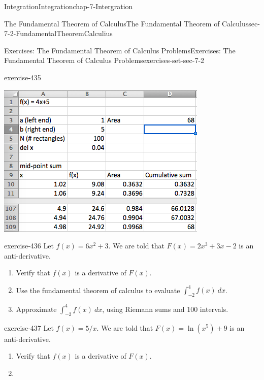 \documentclass[oneside,10pt,]{book}
\numberwithin{equation}{section}
\begin{document}
\begin{chapterptx}{Integration}{}{Integration}{}{}{chap-7-Intergration}
\begin{sectionptx}{The Fundamental Theorem of Calculus}{}{The Fundamental Theorem of Calculus}{}{}{sec-7-2-FundamentalTheoremCalculius}
\begin{exercises-subsection-numberless}{Exercises: The Fundamental Theorem of Calculus Problems}{}{Exercises: The Fundamental Theorem of Calculus Problems}{}{}{exercises-set-sec-7-2}
\begin{divisionexercise}{1}{}{}{exercise-435}
\begin{enumerate}[label=(\alph*)]
\begin{sidebyside}{1}{0.25}{0.25}{0}
\begin{sbspanel}{0.5}
\includegraphics[width=1\linewidth]{images/sec7-2-sol1a.png}
\end{sbspanel}%
\end{sidebyside}%
\end{enumerate}
\end{divisionexercise}%
\begin{divisionexercise}{2}{}{}{exercise-436}%
\hypertarget{p-2663}{}%
Let \(f(x) = 6 x^2 + 3\).  We are told that \(F(x) = 2 x^3 + 3 x - 2\) is an anti-derivative.%
\leavevmode%
\begin{enumerate}[label=(\alph*)]
\item\hypertarget{li-716}{}\hypertarget{p-2664}{}%
Verify that \(f(x)\) is a derivative of \(F(x)\).%
\item\hypertarget{li-717}{}\hypertarget{p-2665}{}%
Use the fundamental theorem of calculus to evaluate \(\int_{-2}^4 f(x)\  dx\).%
\item\hypertarget{li-718}{}\hypertarget{p-2666}{}%
Approximate \(\int_{-2}^4 f(x)\ dx\), using Riemann sums and 100 intervals.%
\end{enumerate}
\end{divisionexercise}%
\begin{divisionexercise}{3}{}{}{exercise-437}%
\hypertarget{p-2667}{}%
Let \(f(x) = 5/x\).  We are told that \(F(x) = \ln(x^5) + 9\) is an anti-derivative.%
\leavevmode%
\begin{enumerate}[label=(\alph*)]
\item\hypertarget{li-719}{}\hypertarget{p-2668}{}%
Verify that \(f(x)\) is a derivative of \(F(x)\).%
\item\hypertarget{li-720}{}\hypertarget{p-2669}{}%

\end{enumerate}
\end{divisionexercise}
\end{exercises-subsection-numberless}
\end{sectionptx}
\end{chapterptx}
\end{document}
